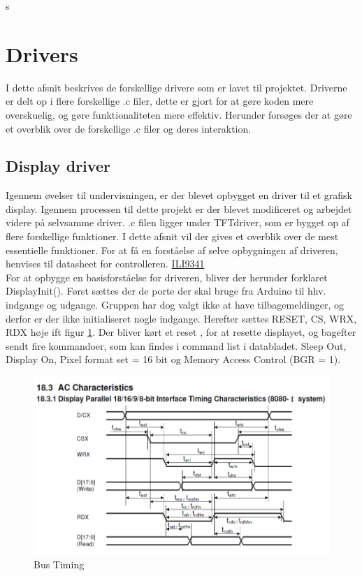 s	%
\graphicspath{{Chapters/Drivers/}}


\section{Drivers}
I dette afsnit beskrives de forskellige drivere som er lavet til projektet. 
Driverne er delt op i flere forskellige .c filer, dette er gjort for at gøre koden mere overskuelig, og gøre funktionaliteten mere effektiv. Herunder forsøges der at gøre et overblik over de forskellige .c filer og deres interaktion.  


\subsection{Display driver}
Igennem øvelser til undervisningen, er der blevet opbygget en driver til et grafisk display. Igennem processen til dette projekt er der blevet modificeret og arbejdet videre på selvsamme driver. .c filen ligger under TFTdriver, som er bygget op af flere forskellige funktioner. I dette afsnit vil der gives et overblik over de mest essentielle funktioner. For at få en forståelse af selve opbygningen af driveren, henvises til datasheet for controlleren. 
\href{https://blackboard.au.dk/bbcswebdav/pid-1697983-dt-content-rid-3847230_1/courses/BB-Cou-UUVA-73302/BB-Cou-UUVA-65758_ImportedContent_20170106021228/BB-Cou-STADS-UUVA-52360_ImportedContent_20160107025559/LAB/Lab3a%20Graphic%20LCD%20Display/Files%20for%20LAB3a/ILI9341_v1.11.pdf}{ILI9341} \\
For at opbygge en basisforståelse for driveren, bliver der herunder forklaret DisplayInit(). Først sættes der de porte der skal bruge fra Arduino til hhv. indgange og udgange. Gruppen har dog valgt ikke at have tilbagemeldinger, og derfor er der ikke initialiseret nogle indgange. Herefter sættes RESET, CS, WRX, RDX høje ift figur \ref{fig:Bus_timing}. Der bliver kørt et reset , for at resette displayet, og bagefter sendt fire kommandoer, som kan findes i command list i databladet. Sleep Out, Display On, Pixel format set = 16 bit og Memory Access Control (BGR = 1).



\begin{figure}[H]
	\centering
	\includegraphics[width = 400 pt]{Img/Bus_timing.png}
	\caption{Bus Timing}
	\label{fig:Bus_timing}
\end{figure}

